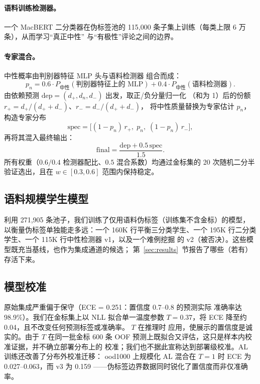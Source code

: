 \documentclass[11pt,a4paper]{article}
\begin{document}
\paragraph{语料训练检测器。} 一个 MacBERT 二分类器在伪标签池的
115{,}000 条子集上训练（每类上限 6 万条），从而学习``真正中性''
与``有极性''评论之间的边界。

\paragraph{专家混合。} 中性概率由判别器特征 MLP 头与语料检测器
组合而成：
\[
  p_n = 0.6 \cdot P_{\text{中性}}(\text{判别器特征上的 MLP})
      + 0.4 \cdot P_{\text{中性}}(\text{语料检测器}).
\]
由依赖预测 $\mathrm{dep}=(d_+,d_n,d_-)$ 出发，取正/负分量归一化
（和为 1）后的份额 $r_+ = d_+/(d_+ + d_-)$、$r_- = d_-/(d_+ + d_-)$，
将中性质量替换为专家估计 $p_n$，构造专家分布
\[
  \mathrm{spec} = \bigl[(1-p_n)\,r_{+},\; p_n,\;
                    (1-p_n)\,r_{-}\bigr],
\]
再将其混入最终输出：
\[
  \mathrm{final} = \frac{\mathrm{dep} + 0.5\,\mathrm{spec}}{1.5}.
\]
所有权重（$0.6/0.4$ 检测器配比、$0.5$ 混合系数）均通过金标集的
20 次随机二分半验证选出，且在 $w \in [0.3, 0.6]$ 范围内保持稳定。

\subsection{语料规模学生模型}
\label{sec:corpus}

利用 271{,}905 条池子，我们训练了仅用语料伪标签（训练集不含金标）的模型，
以衡量伪标签单独能走多远：一个 160K 行平衡三分类学生、一个
195K 行二分类学生、一个 115K 行中性检测器 v1，以及一个难例挖掘
的 v2（被否决）。这些模型既充当基线，也作为集成通道的候选；
第~\ref{sec:results}~节报告了哪些（若有）存活下来。

\subsection{模型校准}
\label{sec:calib}

原始集成严重偏于保守（ECE = 0.251：置信度 0.7--0.8 的预测实际
准确率达 98.9\%）。我们在金标集上以 NLL 拟合单一温度参数
$T = 0.37$，将 ECE 降至约 0.04，且不改变任何预测标签或准确率。
$T$ 在推理时
应用，使展示的置信度是诚实的。由于 $T$ 在同一批金标 600 条 OOF
预测上既拟合又评估，这只是样本内校准证据，并不确立部署分布上的
校准；我们也不据此宣称达到部署级校准。AL 训练还改善了分布外校准迁移：
ood1000 上规模化 AL 混合在 $T{=}1$ 时 ECE 为 0.027--0.063，而 v3 为 0.159
——伪标签边界数据同时锐化了置信度而非仅准确率。
\end{document}
